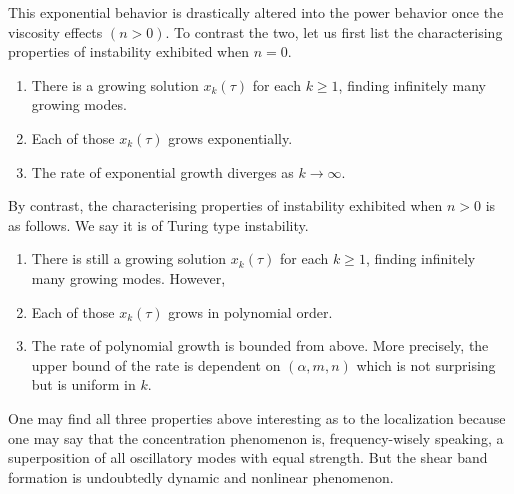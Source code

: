 \documentclass[a4paper,11pt]{article}
\theoremstyle{remark}
\begin{document}
This exponential behavior is drastically altered into the power behavior once the viscosity effects $(n>0)$. To contrast the two, let us first list the characterising properties of instability exhibited when $n=0$. %
\begin{enumerate}
 \item There is a growing solution $x_k(\tau)$ for each $k\ge1$, finding infinitely many growing modes.
 \item Each of those $x_k(\tau)$ grows exponentially.
 \item The rate of exponential growth diverges as $k \rightarrow \infty.$
\end{enumerate}
By contrast, the characterising properties of instability exhibited when $n>0$ is as follows. We say it is of Turing type instability.
\begin{enumerate}
 \item There is still a growing solution $x_k(\tau)$ for each $k\ge1$, finding infinitely many growing modes. However,
 \item Each of those $x_k(\tau)$ grows in polynomial order.
 \item The rate of polynomial growth is bounded from above. More precisely, the upper bound of the rate is dependent on $(\alpha,m,n)$ which is not surprising but is uniform in $k$.
\end{enumerate}
One may find all three properties above interesting as to the localization because one may say that the concentration phenomenon is, frequency-wisely speaking, a superposition of all oscillatory modes with equal strength. But the shear band formation is undoubtedly dynamic and nonlinear phenomenon. %
\end{document}
